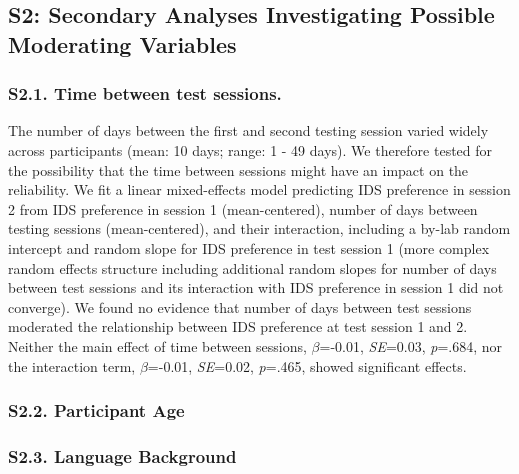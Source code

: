 \documentclass[
  man, donotrepeattitle,floatsintext]{apa6}
\begin{document}
\hypertarget{s2-secondary-analyses-investigating-possible-moderating-variables}{%
\subsection{S2: Secondary Analyses Investigating Possible Moderating Variables}\label{s2-secondary-analyses-investigating-possible-moderating-variables}}

\hypertarget{s2.1.-time-between-test-sessions.}{%
\subsubsection{S2.1. Time between test sessions.}\label{s2.1.-time-between-test-sessions.}}

The number of days between the first and second testing session varied widely across participants (mean: 10 days; range: 1 - 49 days). We therefore tested for the possibility that the time between sessions might have an impact on the reliability. We fit a linear mixed-effects model predicting IDS preference in session 2 from IDS preference in session 1 (mean-centered), number of days between testing sessions (mean-centered), and their interaction, including a by-lab random intercept and random slope for IDS preference in test session 1 (more complex random effects structure including additional random slopes for number of days between test sessions and its interaction with IDS preference in session 1 did not converge). We found no evidence that number of days between test sessions moderated the relationship between IDS preference at test session 1 and 2. Neither the main effect of time between sessions, \(\beta\)=-0.01, \emph{SE}=0.03, \emph{p}=.684, nor the interaction term, \(\beta\)=-0.01, \emph{SE}=0.02, \emph{p}=.465, showed significant effects.

\hypertarget{s2.2.-participant-age}{%
\subsubsection{S2.2. Participant Age}\label{s2.2.-participant-age}}

\hypertarget{s2.3.-language-background}{%
\subsubsection{S2.3. Language Background}\label{s2.3.-language-background}}
\end{document}
